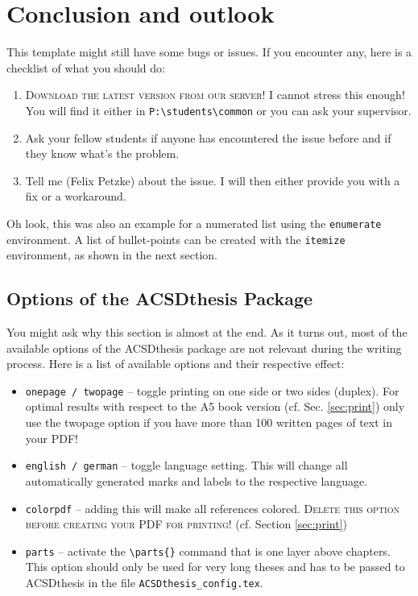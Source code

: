 \chapter{Conclusion and outlook}
This template might still have some bugs or issues. If you encounter any, here is a checklist of what you should do:
\begin{enumerate}
\item \textsc{Download the latest version from our server!} I cannot stress this enough! You will find it either in \texttt{P:\textbackslash students\textbackslash common} or you can ask your supervisor.
\item Ask your fellow students if anyone has encountered the issue before and if they know what's the problem. 
\item Tell me (Felix Petzke) about the issue. I will then either provide you with a fix or a workaround. 
\end{enumerate}

Oh look, this was also an example for a numerated list using the \texttt{enumerate} environment. A list of bullet-points can be created with the \texttt{itemize} environment, as shown in the next section.

\section{Options of the ACSDthesis Package}
\label{sec:options}
You might ask why this section is almost at the end. As it turns out, most of the available options of the ACSDthesis package are not relevant during the writing process. Here is a list of available options and their respective effect:
\begin{itemize}
\item \texttt{onepage / twopage} -- toggle printing on one side or two sides (duplex). For optimal results with respect to the A5 book version (cf. Sec. \ref{sec:print}) only use the twopage option if you have more than 100 written pages of text in your PDF!
\item \texttt{english / german} -- toggle language setting. This will change all automatically generated marks and labels to the respective language.
\item \texttt{colorpdf} -- adding this will make all references colored. \textsc{Delete this option before creating your PDF for printing!} (cf. Section \ref{sec:print})
\item \texttt{parts} -- activate the \texttt{\textbackslash parts\{\}} command that is one layer above chapters. This option should only be used for very long theses and has to be passed to ACSDthesis in the file  \texttt{ACSDthesis\_config.tex}.
\end{itemize}

